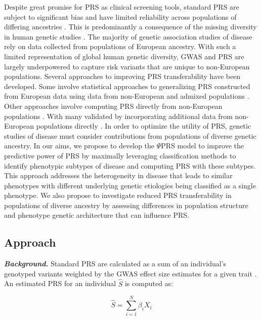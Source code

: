 \documentclass[11pt]{article}  %
\begin{document}
Despite great promise for PRS as clinical screening tools, standard PRS are subject to significant bias and have limited reliability across populations of differing ancestries \cite{majara_low_2021}. This is predominantly a consequence of the missing diversity in human genetic studies \cite{sirugo_missing_2019}. The majority of genetic association studies of disease rely on data collected from populations of European ancestry. With such a limited representation of global human genetic diversity, GWAS and PRS are largely underpowered to capture risk variants that are unique to non-European populations. Several approaches to improving PRS transferability have been developed. Some involve statistical approaches to generalizing PRS constructed from European data using data from non-European and admixed populations \cite{grinde_generalizing_2019}. Other approaches involve computing PRS directly from non-European populations \cite{martin_critical_2018}. With many validated by incorporating additional data from non-European populations directly \cite{cavazos_inclusion_2021}. In order to optimize the utility of PRS, genetic studies of disease must consider contributions from populations of diverse genetic ancestry. 
In our aims, we propose to develop the $\Psi$PRS model to improve the predictive power of PRS by maximally leveraging classification methods to identify phenotypic subtypes of disease and computing PRS with these subtypes. This approach addresses the heterogeneity in disease that leads to similar phenotypes with different underlying genetic etiologies being classified as a single phenotype. We also propose to investigate reduced PRS transferability in populations of diverse ancestry by assessing differences in population structure and phenotype genetic architecture that can influence PRS. 












\subsection*{Approach}

\textbf{\textit{Background.}} Standard PRS are calculated as a sum of an individual's genotyped variants weighted by the GWAS effect size estimates for a given trait \cite{choi_tutorial_2020}. An estimated PRS for an individual $\hat{S}$ is computed as:

$$
\hat{S} = \sum_{i=1}^{N} \beta_i X_i
$$
\end{document}
